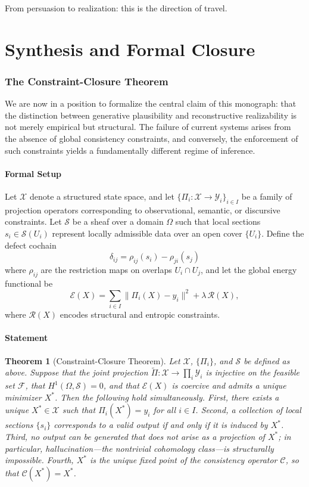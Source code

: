 \documentclass[11pt, oneside]{article}
\newtheorem{theorem}{Theorem}
\begin{document}
From persuasion to realization: this is the direction of travel.

\newpage
\part{Synthesis and Formal Closure}

\section{The Constraint-Closure Theorem}

We are now in a position to formalize the central claim of this monograph: that the distinction between generative plausibility and reconstructive realizability is not merely empirical but structural. The failure of current systems arises from the absence of global consistency constraints, and conversely, the enforcement of such constraints yields a fundamentally different regime of inference.

\subsection{Formal Setup}

Let $\mathcal{X}$ denote a structured state space, and let $\{\Pi_i : \mathcal{X} \to \mathcal{Y}_i\}_{i \in I}$ be a family of projection operators corresponding to observational, semantic, or discursive constraints. Let $\mathcal{S}$ be a sheaf over a domain $\Omega$ such that local sections $s_i \in \mathcal{S}(U_i)$ represent locally admissible data over an open cover $\{U_i\}$. Define the defect cochain
\[
\delta_{ij} = \rho_{ij}(s_i) - \rho_{ji}(s_j)
\]
where $\rho_{ij}$ are the restriction maps on overlaps $U_i \cap U_j$, and let the global energy functional be
\[
\mathcal{E}(X) = \sum_{i \in I} \|\Pi_i(X) - y_i\|^2 + \lambda \, \mathcal{R}(X),
\]
where $\mathcal{R}(X)$ encodes structural and entropic constraints.

\subsection{Statement}

\begin{theorem}[Constraint-Closure Theorem]
Let $\mathcal{X}$, $\{\Pi_i\}$, and $\mathcal{S}$ be defined as above. Suppose that the joint projection $\tilde{\Pi} : \mathcal{X} \to \prod_i \mathcal{Y}_i$ is injective on the feasible set $\mathcal{F}$, that $H^1(\Omega, \mathcal{S}) = 0$, and that $\mathcal{E}(X)$ is coercive and admits a unique minimizer $X^\ast$. Then the following hold simultaneously. First, there exists a unique $X^\ast \in \mathcal{X}$ such that $\Pi_i(X^\ast) = y_i$ for all $i \in I$. Second, a collection of local sections $\{s_i\}$ corresponds to a valid output if and only if it is induced by $X^\ast$. Third, no output can be generated that does not arise as a projection of $X^\ast$; in particular, hallucination---the nontrivial cohomology class---is structurally impossible. Fourth, $X^\ast$ is the unique fixed point of the consistency operator $\mathcal{C}$, so that $\mathcal{C}(X^\ast) = X^\ast$.
\end{theorem}
\end{document}
